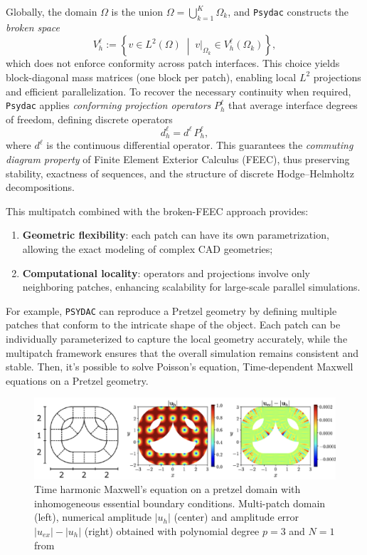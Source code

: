 \documentclass[a4paper,12pt,twoside]{report}
\begin{document}
Globally, the domain $\Omega$ is the union $\Omega = \bigcup_{k=1}^K \Omega_k$, and \texttt{Psydac} constructs the \emph{broken space}
\[
V_h^\ell := \left\{ v \in L^2(\Omega) \; \middle| \; v|_{\Omega_k} \in V_h^\ell(\Omega_k) \right\},
\]
which does not enforce conformity across patch interfaces. This choice yields block-diagonal mass matrices (one block per patch), enabling local $L^2$ projections and efficient parallelization. To recover the necessary continuity when required, \texttt{Psydac} applies \emph{conforming projection operators} $P_h^\ell$ that average interface degrees of freedom, defining discrete operators
\[
d_h^\ell = d^\ell \, P_h^\ell,
\]
where $d^\ell$ is the continuous differential operator. This guarantees the \emph{commuting diagram property} of Finite Element Exterior Calculus (FEEC), thus preserving stability, exactness of sequences, and the structure of discrete Hodge--Helmholtz decompositions.

This multipatch combined with the broken-FEEC approach provides:
\begin{enumerate}
    \item \textbf{Geometric flexibility}: each patch can have its own parametrization, allowing the exact modeling of complex CAD geometries;
    \item \textbf{Computational locality}: operators and projections involve only neighboring patches, enhancing scalability for large-scale parallel simulations.
\end{enumerate}

For example, \texttt{PSYDAC} can reproduce a Pretzel geometry by defining multiple patches that conform to the intricate shape of the object. Each patch can be individually parameterized to capture the local geometry accurately, while the multipatch framework ensures that the overall simulation remains consistent and stable. Then, it's possible to solve Poisson's equation, Time-dependent Maxwell equations on a Pretzel geometry.
\newpage
\begin{figure}[!h]
	\centering
	\includegraphics[width=1\textwidth]{figures/maxwell_pretzel.png}
	\caption{Time harmonic Maxwell's equation on a pretzel domain with inhomogeneous essential boundary conditions. Multi-patch domain (left), numerical amplitude $|u_h|$ (center) and amplitude error $|u_{ex}| - |u_h|$ (right) obtained with polynomial degree $p = 3$ and $N = 1$ from \cite{guclu_psydac_2022}}
\end{figure}
\end{document}
